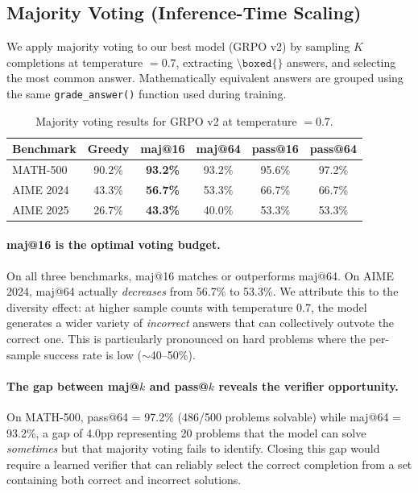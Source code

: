 \documentclass[11pt,a4paper]{article}
\newcommand{\boxedcmd}{\texttt{\textbackslash boxed\{\}}}
\begin{document}
\subsection{Majority Voting (Inference-Time Scaling)}
\label{sec:majority-voting}

We apply majority voting to our best model (GRPO v2) by sampling $K$ completions at temperature $= 0.7$, extracting $\boxedcmd{}$ answers, and selecting the most common answer. Mathematically equivalent answers are grouped using the same \texttt{grade\_answer()} function used during training.

\begin{table}[H]
\centering
\caption{Majority voting results for GRPO v2 at temperature $= 0.7$.}
\label{tab:majority-voting}
\begin{tabular}{lccccc}
\toprule
\textbf{Benchmark} & \textbf{Greedy} & \textbf{maj@16} & \textbf{maj@64} & \textbf{pass@16} & \textbf{pass@64} \\
\midrule
MATH-500 & 90.2\% & \textbf{93.2\%} & 93.2\% & 95.6\% & 97.2\% \\
AIME 2024 & 43.3\% & \textbf{56.7\%} & 53.3\% & 66.7\% & 66.7\% \\
AIME 2025 & 26.7\% & \textbf{43.3\%} & 40.0\% & 53.3\% & 53.3\% \\
\bottomrule
\end{tabular}
\end{table}

\paragraph{maj@16 is the optimal voting budget.} On all three benchmarks, maj@16 matches or outperforms maj@64. On AIME 2024, maj@64 actually \emph{decreases} from 56.7\% to 53.3\%. We attribute this to the diversity effect: at higher sample counts with temperature 0.7, the model generates a wider variety of \emph{incorrect} answers that can collectively outvote the correct one. This is particularly pronounced on hard problems where the per-sample success rate is low ($\sim$40--50\%).

\paragraph{The gap between maj@$k$ and pass@$k$ reveals the verifier opportunity.} On MATH-500, pass@64 = 97.2\% (486/500 problems solvable) while maj@64 = 93.2\%, a gap of 4.0pp representing 20 problems that the model can solve \emph{sometimes} but that majority voting fails to identify. Closing this gap would require a learned verifier that can reliably select the correct completion from a set containing both correct and incorrect solutions.
\end{document}
